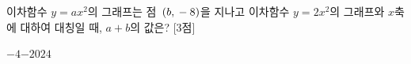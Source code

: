 이차함수 $y=ax^2$의 그래프는 점~$(b{,}\mkern3mu -8)$을 지나고 이차함수 $y=2x^2$의 그래프와 $x$축에 대하여 대칭일 때, $a+b$의 값은?  \mbox{[3점]}
\begin{choices32}{$-4$}{$-2$}{$0$}{$2$}{$4$}\end{choices32}

